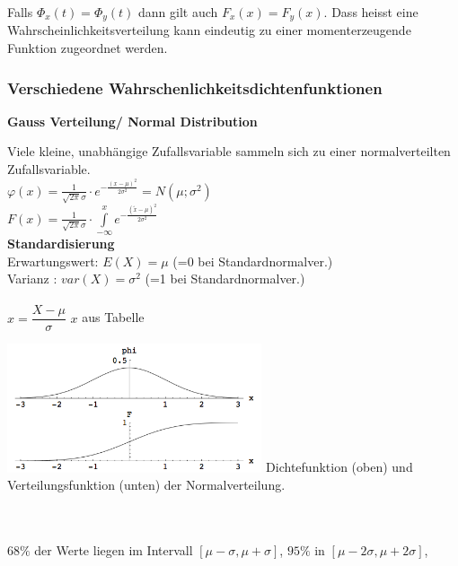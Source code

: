 		Falls $\Phi_x(t) = \Phi_y(t)$ dann gilt auch $F_x(x)=F_y(x)$. Dass heisst eine Wahrscheinlichkeitsverteilung kann eindeutig zu einer momenterzeugende Funktion zugeordnet werden.
		
		
			
	\subsubsection{Verschiedene Wahrschenlichkeitsdichtenfunktionen}
		\textbf{Gauss Verteilung/ Normal Distribution}\\
 		\begin{minipage}{10cm}
		Viele kleine, unabhängige Zufallsvariable sammeln sich zu einer
		normalverteilten Zufallsvariable.\\
		 $\varphi(x)=\frac{1}{\sqrt{2
		\pi}\sigma}\cdot e^{-\frac{(x-\mu)^2}{2\sigma^2}} = N(\mu ; \sigma^2) $\\ 
		$F(x)=\frac{1}{\sqrt{2
		\pi}\sigma}\cdot \int\limits^{x}_{-\infty}{e^{-\frac{(\tilde{x} -\mu)^2}{2\sigma^2}}} $ \\
		\textbf{Standardisierung}\\
		Erwartungswert: $E(X)=\mu$ \hspace{4mm}(=0 bei Standardnormalver.)\\ 
		Varianz \hspace{11.5mm}: $var(X)=\sigma^2$ (=1 bei Standardnormalver.)\\ \\
		$x=\dfrac{X-\mu}{\sigma}$ \hspace{5mm} $x$ aus Tabelle
		\end{minipage}
		\hspace{5mm}
		\begin{minipage}{7.5cm}
		\includegraphics[width=7.5cm]{bilder/normalverteilung.png}
		Dichtefunktion (oben) und Verteilungsfunktion (unten) der Normalverteilung. 
   		\end{minipage} \\ \\
		$ 68\% $ der Werte liegen im Intervall $[ \mu - \sigma, \mu + \sigma]$, 
		$95\% $ in $[ \mu - 2\sigma, \mu + 2\sigma]$, 	
